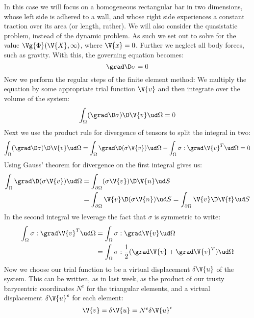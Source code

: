 \documentclass[sigconf]{acmart}
\begin{document}
In this case we will focus on a homogeneous rectangular bar in two dimensions, whose left side is adhered to a wall, and whose right side experiences a constant traction over its area (or length, rather). We will also consider the quasistatic problem, instead of the dynamic problem. As such we set out to solve for the value $ \Vg{\Phi}(\V{X}, \infty) $, where $ \ddot{\V{x}}=0 $. Further we neglect all body forces, such as gravity. With this, the governing equation becomes:
\begin{equation}
	\grad \D \sigma = 0
\end{equation}
Now we perform the regular steps of the finite element method: We multiply the equation by some appropriate trial function $ \V{v} $ and then integrate over the volume of the system:
\begin{equation}
	\int_{\Omega} (\grad \D \sigma) \D \V{v} \ud \Omega = 0
\end{equation}
Next we use the product rule for divergence of tensors to split the integral in two:
\begin{align*}
	\int_{\Omega} (\grad \D \sigma) \D \V{v} \ud \Omega = \int_{\Omega} \grad \D (\sigma \V{v}) \ud \Omega - \int_{\Omega} \sigma : \grad \V{v}^T \ud \Omega = 0
\end{align*}
Using Gauss' theorem for divergence on the first integral gives us:
\begin{align}
	\int_{\Omega} \grad \D (\sigma \V{v}) \ud \Omega &= \int_{\partial \Omega} (\sigma \V{v}) \D \V{n} \ud S\nonumber \\
	&= \int_{\partial \Omega} \V{v} \D (\sigma \V{n}) \ud S = \int_{\partial \Omega} \V{v} \D \V{t} \ud S \label{eq:boundary}
\end{align}
In the second integral we leverage the fact that $ \sigma $ is symmetric to write:
\begin{align}
	\int_{\Omega} \sigma : \grad \V{v}^T \ud \Omega &= \int_{\Omega} \sigma : \grad \V{v} \ud \Omega \nonumber\\
	&= \int_{\Omega} \sigma : \frac{1}{2} (\grad \V{v} + \grad \V{v}^T) \ud \Omega \label{eq:euler_strain_1}
\end{align}
Now we choose our trial function to be a virtual displacement $ \delta \V{u} $ of the system.  This can be written, as in last week, as the product of our trusty barycentric coordinates $ N^e $ for the triangular elements, and a virtual displacement $ \delta\V{u}^e $ for each element:
\begin{equation*}
	\V{v} = \delta \V{u} = N^e \delta\V{u}^e
\end{equation*}
\end{document}
